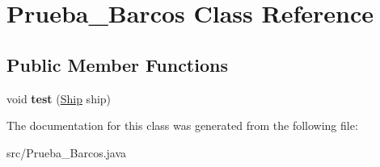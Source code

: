 \hypertarget{class_prueba___barcos}{\section{Prueba\-\_\-\-Barcos Class Reference}
\label{class_prueba___barcos}
}
\subsection*{Public Member Functions}
\begin{DoxyCompactItemize}
\item 
\hypertarget{class_prueba___barcos_affcac0d8ab33c140d10dd1023d2c7934}{void {\bfseries test} (\hyperlink{class_ship}{Ship} ship)}\label{class_prueba___barcos_affcac0d8ab33c140d10dd1023d2c7934}

\end{DoxyCompactItemize}


The documentation for this class was generated from the following file\-:\begin{DoxyCompactItemize}
\item 
src/Prueba\-\_\-\-Barcos.\-java\end{DoxyCompactItemize}
